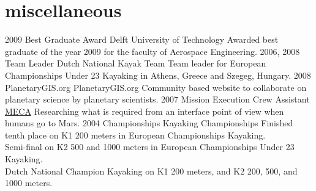 \documentclass[]{friggeri-cv}
\begin{document}
\section{miscellaneous}

\begin{entrylist}
  \entry
    {2009}
    {Best Graduate Award}
    {Delft University of Technology}
    {Awarded best graduate of the year 2009 for the faculty of Aerospace Engineering.}
  \entry
    {2006, 2008}
    {Team Leader}
    {Dutch National Kayak Team}
    {Team leader for European Championships Under 23 Kayaking in Athens, Greece and Szegeg, Hungary.}
  \entry
    {2008}
    {PlanetaryGIS.org}
    {PlanetaryGIS.org}
    {Community based website to collaborate on planetary science by planetary scientists.}
  \entry
    {2007}
    {Mission Execution Crew Assistant}
    {\href{http:\\crewassistant.com}{MECA}}
    {Researching what is required from an interface point of view when humans go to Mars.}
  \entry
    {2004}
    {Championships}
    {Kayaking Championships}
    {Finished tenth place on K1 200 meters in European Championships Kayaking. \\
    Semi-final on K2 500 and 1000 meters in European Championships Under 23 Kayaking. \\
    Dutch National Champion Kayaking on K1 200 meters, and K2 200, 500, and 1000 meters.
    }
\end{entrylist}
\end{document}
